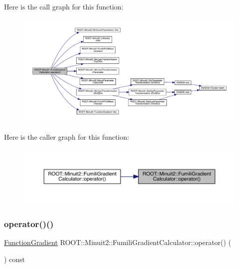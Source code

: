 Here is the call graph for this function\+:
\nopagebreak
\begin{figure}[H]
\begin{center}
\leavevmode
\includegraphics[width=350pt]{d8/de6/classROOT_1_1Minuit2_1_1FumiliGradientCalculator_a23fd61bceabbf88e66c5abe6b2815331_cgraph}
\end{center}
\end{figure}
Here is the caller graph for this function\+:
\nopagebreak
\begin{figure}[H]
\begin{center}
\leavevmode
\includegraphics[width=350pt]{d8/de6/classROOT_1_1Minuit2_1_1FumiliGradientCalculator_a23fd61bceabbf88e66c5abe6b2815331_icgraph}
\end{center}
\end{figure}
\mbox{\label{classROOT_1_1Minuit2_1_1FumiliGradientCalculator_a23fd61bceabbf88e66c5abe6b2815331}} 
\subsubsection{\texorpdfstring{operator()()}{operator()()}\hspace{0.1cm}{\footnotesize\ttfamily [2/6]}}
{\footnotesize\ttfamily \mbox{\hyperlink{classROOT_1_1Minuit2_1_1FunctionGradient}{Function\+Gradient}} R\+O\+O\+T\+::\+Minuit2\+::\+Fumili\+Gradient\+Calculator\+::operator() (\begin{DoxyParamCaption}\item[{const \mbox{\hyperlink{classROOT_1_1Minuit2_1_1MinimumParameters}{Minimum\+Parameters}} \&}]{ }\end{DoxyParamCaption}) const\hspace{0.3cm}{\ttfamily [virtual]}}



